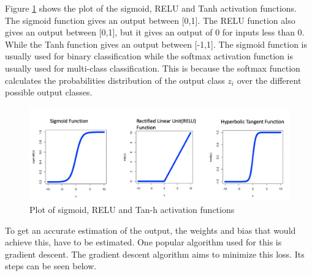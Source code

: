 Figure \ref{fig:activations} shows the plot of the sigmoid, RELU and Tanh activation functions. The sigmoid function gives an output between [0,1]. The RELU function also gives an output between [0,1], but it gives an output of 0 for inputs less than 0.  While the Tanh function gives an output between [-1,1].  The sigmoid function is usually used for binary classification while the softmax activation function is usually used for multi-class classification.  This is because the softmax function calculates the probabilities distribution of the output class $z_i$  over the different possible output classes.
\begin{figure}
\centering
  \includegraphics[width=\linewidth, scale=1]{activations.png}
  \caption{Plot of sigmoid, RELU and Tan-h activation functions}
  \label{fig:activations}
\end{figure}
To get an accurate estimation of the output, the weights and bias that would achieve this, have to be estimated. One popular algorithm used for this is gradient descent. The gradient descent algorithm aims to minimize this loss. Its steps can be seen below. 
